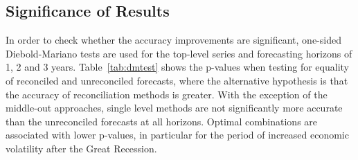 \documentclass[a4paper,fleqn,11pt]{article}
\begin{document}
\subsection{Significance of Results}
In order to check whether the accuracy improvements are significant, one-sided Diebold-Mariano tests are used for the top-level series and forecasting horizons of 1, 2 and 3 years. Table~\ref{tab:dmtest} shows the p-values when testing for equality of reconciled and unreconciled forecasts, where the alternative hypothesis is that the accuracy of reconciliation methods is greater. With the exception of the middle-out approaches, single level methods are not significantly more accurate than the unreconciled forecasts at all horizons. Optimal combinations are associated with lower p-values, in particular for the period of increased economic volatility after the Great Recession.
\end{document}
